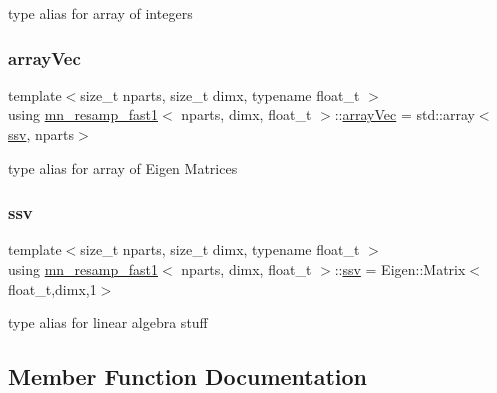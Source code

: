 type alias for array of integers \mbox{\label{classmn__resamp__fast1_af55a3279b6b865cb2656ea4e7e832136}} 
\subsubsection{\texorpdfstring{array\+Vec}{arrayVec}}
{\footnotesize\ttfamily template$<$size\+\_\+t nparts, size\+\_\+t dimx, typename float\+\_\+t $>$ \\
using \hyperlink{classmn__resamp__fast1}{mn\+\_\+resamp\+\_\+fast1}$<$ nparts, dimx, float\+\_\+t $>$\+::\hyperlink{classrbase_aa12fc826befa6ba0647b5f59ebc396ee}{array\+Vec} =  std\+::array$<$\hyperlink{classrbase_ae20e0b8df15aa109252f57ecbf1f20f8}{ssv}, nparts$>$}

type alias for array of Eigen Matrices \mbox{\label{classmn__resamp__fast1_a262ade482db1a5205579fb30dd39335a}} 
\subsubsection{\texorpdfstring{ssv}{ssv}}
{\footnotesize\ttfamily template$<$size\+\_\+t nparts, size\+\_\+t dimx, typename float\+\_\+t $>$ \\
using \hyperlink{classmn__resamp__fast1}{mn\+\_\+resamp\+\_\+fast1}$<$ nparts, dimx, float\+\_\+t $>$\+::\hyperlink{classrbase_ae20e0b8df15aa109252f57ecbf1f20f8}{ssv} =  Eigen\+::\+Matrix$<$float\+\_\+t,dimx,1$>$}

type alias for linear algebra stuff 

\subsection{Member Function Documentation}
\mbox{\label{classmn__resamp__fast1_a398e64faa29bafd345c0258ca90d489c}} 
